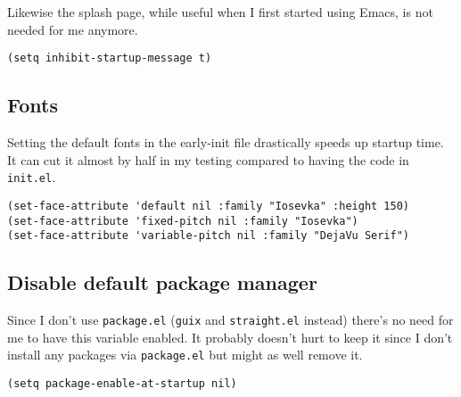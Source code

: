 \documentclass[11pt]{article}
\begin{document}
Likewise the splash page, while useful when I first started using
Emacs, is not needed for me anymore.
\begin{verbatim}
(setq inhibit-startup-message t)
\end{verbatim}

\subsection{Fonts}
\label{sec:org11ca543}
Setting the default fonts in the early-init file drastically speeds up
startup time. It can cut it almost by half in my testing compared to
having the code in \texttt{init.el}.
\begin{verbatim}
(set-face-attribute 'default nil :family "Iosevka" :height 150)
(set-face-attribute 'fixed-pitch nil :family "Iosevka")
(set-face-attribute 'variable-pitch nil :family "DejaVu Serif")
\end{verbatim}

\subsection{Disable default package manager}
\label{sec:org36e77af}
Since I don't use \texttt{package.el} (\texttt{guix} and \texttt{straight.el} instead) there's no
need for me to have this variable enabled. It probably doesn't hurt to
keep it since I don't install any packages via \texttt{package.el} but might as
well remove it.
\begin{verbatim}
(setq package-enable-at-startup nil)
\end{verbatim}
\end{document}
